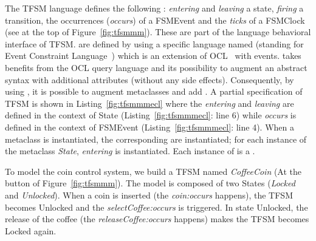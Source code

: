 The TFSM language defines the following \dse: \emph{entering} and \emph{leaving} a state, \emph{firing} a transition, the occurrences (\emph{occurs}) of a FSMEvent and the \emph{ticks} of a FSMClock (see at the top of Figure~\ref{fig:tfsmmm}). These \dse are part of the language behavioral interface of TFSM. \dse are defined by using a specific language named \ecl (standing for Event Constraint Language~\cite{eclbib}) which is an extension of OCL~\cite{omgocl2bib} with events. \ecl takes benefits from the OCL query language and its possibility to augment an abstract syntax with additional attributes (without any side effects). Consequently, by using \ecl, it is possible to augment \as metaclasses and add \dse. A partial \ecl specification of TFSM is shown in Listing~\ref{fig:tfsmmmecl} where the \dse \textit{entering} and \textit{leaving} are defined in the context of State (Listing~\ref{fig:tfsmmmecl}: line 6) while \textit{occurs} is defined in the context of FSMEvent (Listing~\ref{fig:tfsmmmecl}: line 4). When a metaclass is instantiated, the corresponding \dse are instantiated; \eg for each instance of the metaclass \emph{State}, \dse \textit{entering} is instantiated. Each instance of \dse is a \mse. 
	
To model the coin control system, we build a TFSM named \emph{CoffeeCoin} (At the button of Figure~\ref{fig:tfsmmm}). The model is composed of two States (\emph{Locked} and \emph{Unlocked}). When a coin is inserted (the \mse \emph{coin:occurs} happens), the TFSM becomes Unlocked and the \mse \emph{selectCoffee:occurs} is triggered. In state Unlocked, the release of the coffee (the \mse \emph{releaseCoffee:occurs} happens) makes the TFSM becomes Locked again.   
	
